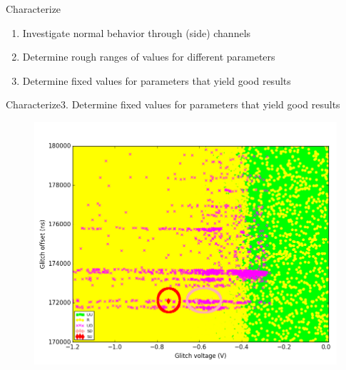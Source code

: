 \documentclass[table]{beamer}
\begin{document}

\begin{frame}{Characterize}
    \begin{enumerate}
        \item Investigate normal behavior through (side) channels 
        \item Determine rough ranges of values for different parameters
        \item Determine fixed values for parameters that yield good results
    \end{enumerate}
\end{frame}

\begin{frame}{Characterize}{3. Determine fixed values for parameters that yield good results}
    \vspace{-.3cm}
    \begin{figure}[H]
      \centering
      \includegraphics[width=.85\textwidth]{../../plots/newplots/ti-jtag-voltage-offset.png}
    \end{figure}
\ \\
\end{frame}
\end{document}
